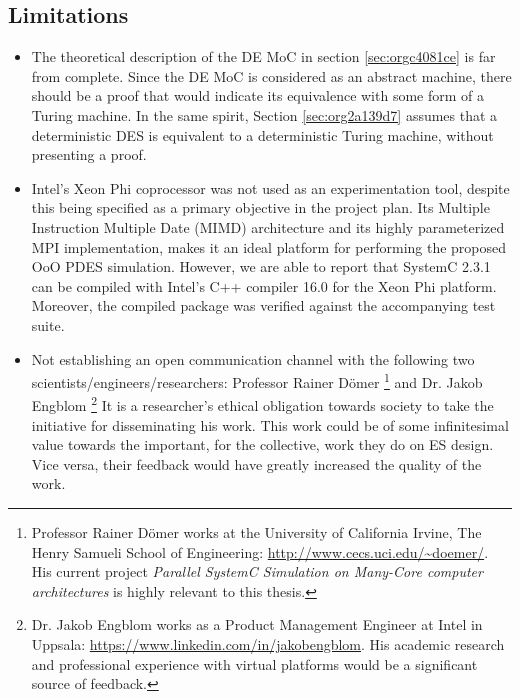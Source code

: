 \documentclass[11pt]{article}
\begin{document}
\subsection{Limitations}
\label{sec:org5a88de4}
\begin{itemize}
\item The theoretical description of the DE MoC in section \ref{sec:orgc4081ce} is far from complete.
Since the DE MoC is considered as an abstract machine, there should be a proof that would indicate its equivalence with some form of a Turing machine.
In the same spirit, Section \ref{sec:org2a139d7} assumes that a deterministic DES is equivalent to a deterministic Turing machine, without presenting a proof.

\item Intel's Xeon Phi coprocessor was not used as an experimentation tool, despite this being specified as a primary objective in the project plan.
Its Multiple Instruction Multiple Date (MIMD) architecture and its highly parameterized MPI implementation, makes it an ideal platform for performing the proposed OoO PDES simulation.
However, we are able to report that SystemC 2.3.1 can be compiled with Intel's C++ compiler 16.0 for the Xeon Phi platform. 
Moreover, the compiled package was verified against the accompanying test suite.

\item Not establishing an open communication channel with the following two scientists/engineers/researchers: Professor Rainer Dömer \footnote{Professor Rainer Dömer works at the University of California Irvine, The Henry Samueli School of Engineering: \url{http://www.cecs.uci.edu/\~doemer/}. 
His current project \textit{Parallel SystemC Simulation on Many-Core computer architectures} is highly relevant to this thesis.} and Dr. Jakob Engblom \footnote{Dr. Jakob Engblom works as a Product Management Engineer at Intel in Uppsala: \url{https://www.linkedin.com/in/jakobengblom}.
His academic research and professional experience with virtual platforms would be a significant source of feedback.}
It is a researcher's ethical obligation towards society to take the initiative for disseminating his work.
This work could be of some infinitesimal value towards the important, for the collective, work they do on ES design.
Vice versa, their feedback would have greatly increased the quality of the work.
\end{itemize}
\end{document}
